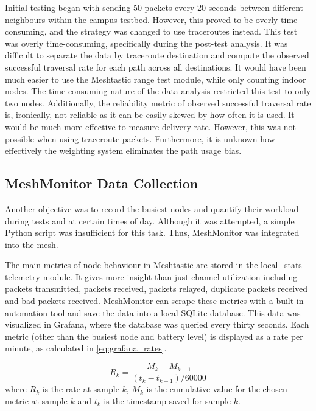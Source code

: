 \documentclass[11pt]{article}
\begin{document}
Initial testing began with sending 50 packets every 20 seconds between different neighbours within the campus testbed. However, this proved to be overly time-consuming, and the strategy was changed to use traceroutes instead. This test was overly time-consuming, specifically during the post-test analysis. It was difficult to separate the data by traceroute destination and compute the observed successful traversal rate for each path across all destinations. It would have been much easier to use the Meshtastic range test module, while only counting indoor nodes. The time-consuming nature of the data analysis restricted this test to only two nodes. Additionally, the reliability metric of observed successful traversal rate is, ironically, not reliable as it can be easily skewed by how often it is used. It would be much more effective to measure delivery rate. However, this was not possible when using traceroute packets. Furthermore, it is unknown how effectively the weighting system eliminates the path usage bias. 

\subsection{MeshMonitor Data Collection}

Another objective was to record the busiest nodes and quantify their workload during tests and at certain times of day. Although it was attempted, a simple Python script was insufficient for this task. Thus, MeshMonitor was integrated into the mesh.

The main metrics of node behaviour in Meshtastic are stored in the local\_stats telemetry module. It gives more insight than just channel utilization including packets transmitted, packets received, packets relayed, duplicate packets received and bad packets received. MeshMonitor can scrape these metrics with a built-in automation tool and save the data into a local SQLite database. This data was visualized in Grafana, where the database was queried every thirty seconds. Each metric (other than the busiest node and battery level) is displayed as a rate per minute, as calculated in \eqref{eq:grafana_rates}. 

\begin{equation}
    R_k = \frac{M_k - M_{k-1}}{(t_k - t_{k-1})/60000}
    \label{eq:grafana_rates}
\end{equation}
where $R_k$ is the rate at sample $k$, $M_k$ is the cumulative value for the chosen metric at sample $k$ and $t_k$ is the timestamp saved for sample $k$.
\end{document}
